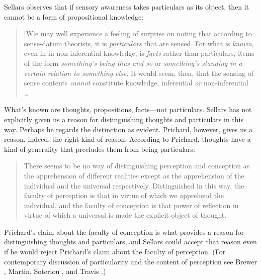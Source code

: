 \documentclass[12pt]{article}
\begin{document}
Sellars observes that if sensory awareness takes particulars as its object, then it cannot be a form of propositional knowledge:
\begin{quote}
	[W]e may well experience a feeling of surprise on noting that according to sense-datum theorists, it is \emph{particulars} that are sensed. For what is \emph{known}, even in in non-inferential knowledge, is \emph{facts} rather than particulars, items of the form \emph{something's being thus and so} or \emph{something's standing in a certain relation to something else}. It would seem, then, that the sensing of sense contents \emph{cannot} constitute knowledge, inferential \emph{or} non-inferential \ldots\ \citep[§3]{Sellars:1956xp}
\end{quote}
What's known are thoughts, propositions, facts---not particulars. Sellars has not explicitly given us a reason for distinguishing thoughts and particulars in this way. Perhaps he regards the distinction as evident. Prichard, however, gives us a reason, indeed, the right kind of reason. According to Prichard, thoughts have a kind of generality that precludes them from being particulars:
\begin{quote}
	There seems to be no way of distinguishing perception and conception as the apprehension of different realities except as the apprehension of the individual and the universal respectively. Distinguished in this way, the faculty of perception is that in virtue of which we apprehend the individual, and the faculty of conception is that power of reflection in virtue of which a universal is made the explicit object of thought. \citep[]{Prichard:1909yg}
\end{quote}
Prichard's claim about the faculty of conception is what provides a reason for distinguishing thoughts and particulars, and Sellars could accept that reason even if he would reject Prichard's claim about the faculty of perception. (For contemporary discussion of particularity and the content of perception see Brewer \citeyear{Brewer:2008fk}, Martin, \citeyear{Martin:2002jb} Soteriou \citeyear{Soteriou:2000iz,Soteriou:2005fk}, and Travis \citeyear{Travis:2005ys}.)
\end{document}
